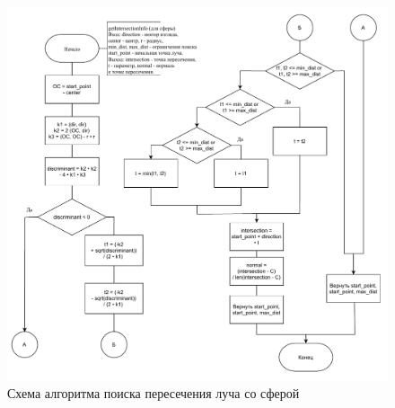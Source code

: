 \begin{figure}[H]
	\begin{center}
		\includegraphics[width=\linewidth]{img/sphere_intersection.pdf}
	\end{center}
	\captionsetup{justification=centering}
	\caption{Схема алгоритма поиска пересечения луча со сферой}
	\label{img:sphere_intersection}
\end{figure}

